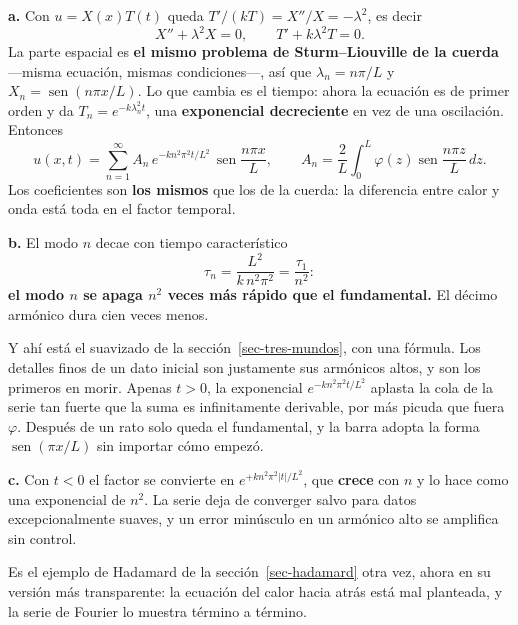 \documentclass[
  spanish,
  a4paper,
]{scrbook}
\theoremstyle{definition}
\theoremstyle{plain}
\theoremstyle{definition}
\theoremstyle{plain}
\theoremstyle{definition}
\theoremstyle{remark}
\begin{document}
\begin{tcolorbox}[enhanced jigsaw, arc=.35mm, bottomrule=.15mm, bottomtitle=1mm, breakable, colback=white, colbacktitle=quarto-callout-tip-color!10!white, colframe=quarto-callout-tip-color-frame, coltitle=black, left=2mm, leftrule=.75mm, opacityback=0, opacitybacktitle=0.6, rightrule=.15mm, title=\textcolor{quarto-callout-tip-color}{\faLightbulb}\hspace{0.5em}{Solución}, titlerule=0mm, toprule=.15mm, toptitle=1mm]

\textbf{a.} Con \(u = X(x)T(t)\) queda \(T'/(kT) = X''/X = -\lambda^2\),
es decir \[X'' + \lambda^2X = 0, \qquad T' + k\lambda^2T = 0 .\] La
parte espacial es \textbf{el mismo problema de Sturm--Liouville de la
cuerda} ---misma ecuación, mismas condiciones---, así que
\(\lambda_n = n\pi/L\) y \(X_n = \operatorname{sen}(n\pi x/L)\). Lo que
cambia es el tiempo: ahora la ecuación es de primer orden y da
\(T_n = e^{-k\lambda_n^2 t}\), una \textbf{exponencial decreciente} en
vez de una oscilación. Entonces \[
u(x,t) = \sum_{n=1}^{\infty} A_n\,e^{-k n^2\pi^2 t/L^2}\,\operatorname{sen}\frac{n\pi x}{L},
\qquad
A_n = \frac{2}{L}\int_0^L \varphi(z)\operatorname{sen}\frac{n\pi z}{L}\,dz .
\] Los coeficientes son \textbf{los mismos} que los de la cuerda: la
diferencia entre calor y onda está toda en el factor temporal.

\textbf{b.} El modo \(n\) decae con tiempo característico
\[\tau_n = \frac{L^2}{k\,n^2\pi^2} = \frac{\tau_1}{n^2} :\] \textbf{el
modo \(n\) se apaga \(n^2\) veces más rápido que el fundamental.} El
décimo armónico dura cien veces menos.

Y ahí está el suavizado de la sección~\ref{sec-tres-mundos}, con una
fórmula. Los detalles finos de un dato inicial son justamente sus
armónicos altos, y son los primeros en morir. Apenas \(t>0\), la
exponencial \(e^{-kn^2\pi^2t/L^2}\) aplasta la cola de la serie tan
fuerte que la suma es infinitamente derivable, por más picuda que fuera
\(\varphi\). Después de un rato solo queda el fundamental, y la barra
adopta la forma \(\operatorname{sen}(\pi x/L)\) sin importar cómo
empezó.

\textbf{c.} Con \(t<0\) el factor se convierte en
\(e^{+k n^2\pi^2|t|/L^2}\), que \textbf{crece} con \(n\) y lo hace como
una exponencial de \(n^2\). La serie deja de converger salvo para datos
excepcionalmente suaves, y un error minúsculo en un armónico alto se
amplifica sin control.

Es el ejemplo de Hadamard de la sección~\ref{sec-hadamard} otra vez,
ahora en su versión más transparente: la ecuación del calor hacia atrás
está mal planteada, y la serie de Fourier lo muestra término a término.

\end{tcolorbox}
\end{document}
